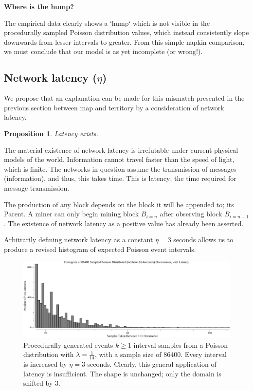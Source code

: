\documentclass[11pt]{article}
\theoremstyle{plain}
\newtheorem{proposition}{Proposition}[section]
\begin{document}
\pagebreak

\textbf{Where is the hump?}

The empirical data clearly shows a `hump` which is not visible in the
procedurally sampled Poisson distribution values,
which instead consistently slope downwards from lesser intervals to greater.
From this simple napkin comparison, we must conclude that our model is as yet
incomplete (or wrong!).

\subsection{\normalsize{Network latency ($\eta$)}}

We propose that an explanation can be made for this mismatch presented in the
previous section between map and territory by a consideration of network
latency.

\vspace{5mm}
\begin{proposition}
  Latency exists.
\end{proposition}

The material existence of network latency is irrefutable under
current physical models of the world.
Information cannot travel faster than the speed of light, which is finite.
The networks in question assume the transmission of messages (information), and
thus, this takes time.
This is latency; the time required for message transmission.

The production of any block depends on the block it will be appended to; its
Parent.
A miner can only begin mining block $B_{i=n}$ after observing block $B_{i=n-1}$.
The existence of network latency as a positive value has already been asserted.

Arbitrarily defining network latency as a constant $\eta=3$ seconds allows us
to produce a revised histogram of expected Poisson event intervals.

\begin{figure}[tph]
    \centering
\includegraphics[width=1.0\textwidth]{go-block-step/out/vis_poisson_samples_eventintervals_latencynaive_hist.png}
    \caption{
      Procedurally generated events $k \geq 1$ interval samples from a Poisson distribution
with $\lambda = \frac{1}{14}$, with a sample size of 86400.
      Every interval is increased by $\eta=3$ seconds.
    Clearly, this general application of latency is insufficient.
    The shape is unchanged; only the domain is shifted by $3$.
    }
\end{figure}
\end{document}
